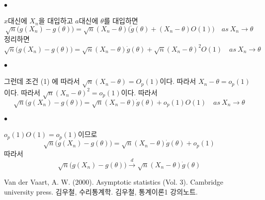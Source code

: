 \documentclass[12pt,oneside,english]{book}
\def\ck{\paragraph{\large$\bullet$}\large}
\begin{document}
\ck $x$대신에 $X_n$을 대입하고 $a$대신에 $\theta$를 대입하면 
\[
\sqrt{n}\big({g(X_n) -g(\theta)}\big) = \sqrt{n}(X_n-\theta)\big(\dot{g}(\theta)+(X_n-\theta)O(1)\big) \quad as ~ X_n \to \theta
\]
정리하면 
\[
\sqrt{n}\big({g(X_n) -g(\theta)}\big) = \sqrt{n}(X_n-\theta)\dot{g}(\theta)+\sqrt{n}(X_n-\theta)^2O(1) \quad as ~ X_n \to \theta
\]

\ck 그런데 조건 (1) 에 따라서 $\sqrt{n}(X_n-\theta)=O_p(1)$이다. 따라서 $X_n-\theta = o_p(1)$이다. 따라서 $\sqrt{n}(X_n-\theta)^2=o_p(1)$이다. 따라서 
\[
\sqrt{n}\big({g(X_n) -g(\theta)}\big) = \sqrt{n}(X_n-\theta)\dot{g}(\theta)+o_p(1)O(1) \quad as ~ X_n \to \theta
\]

\ck $o_p(1)O(1)=o_p(1)$이므로 
\[
\sqrt{n}\big({g(X_n) -g(\theta)}\big) = \sqrt{n}(X_n-\theta)\dot{g}(\theta)+o_p(1) 
\]
따라서 
\[
\sqrt{n}\big({g(X_n) -g(\theta)}\big) \overset{d}{\to} \sqrt{n}(X_n-\theta)\dot{g}(\theta)
\]


\begin{thebibliography}{9} 
 Van der Vaart, A. W. (2000). Asymptotic statistics (Vol. 3). Cambridge university press.
 김우철, 수리통계학.
 김우철, 통계이론1 강의노트.
\end{thebibliography}
\end{document}
